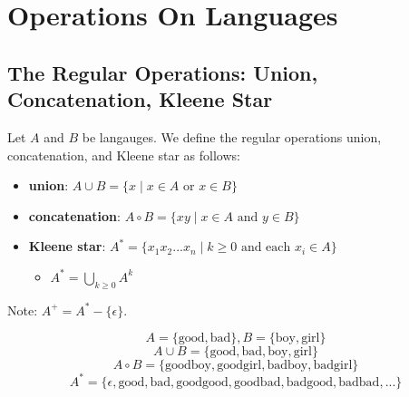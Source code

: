 \documentclass[11pt,a4paper]{article}
\begin{document}
\tableofcontents


\section{Operations On Languages}
\subsection{The Regular Operations: Union, Concatenation, Kleene Star}
\begin{definition}
    Let $A$ and $B$ be langauges. We define the regular operations union, concatenation, and Kleene star as follows:

    \begin{itemize}
        \item \textbf{union}: $A\cup B = \{x \mid x\in A\text{ or }x\in B\}$
        \item \textbf{concatenation}: $A\circ B = \{xy\mid x\in A\text{ and }y\in B\}$
        \item \textbf{Kleene star}: $A^* = \{x_1x_2 ... x_n\mid k\geq 0 \text{ and each } x_i\in A\}$
        \begin{itemize}
            \item $A^* = \bigcup\limits_{k\geq 0}A^k$
        \end{itemize}
    \end{itemize}

    Note: $A^+=A^*-\{\epsilon\}$.
\end{definition}

\begin{example}
    $$A=\{\text{good},\text{bad}\},B=\{\text{boy},\text{girl}\}$$
    $$A\cup B=\{\text{good},\text{bad},\text{boy},\text{girl}\}$$
    $$A\circ B=\{\text{goodboy},\text{goodgirl},\text{badboy},\text{badgirl}\}$$
    $$A^*=\{\epsilon,\text{good},\text{bad},\text{goodgood},\text{goodbad},\text{badgood},\text{badbad},...\}$$
\end{example}
\end{document}
